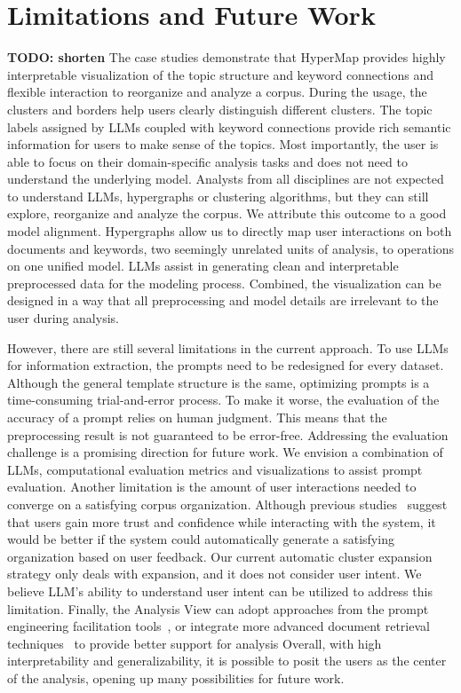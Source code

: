 \section{Limitations and Future Work}
\textbf{TODO: shorten}
The case studies demonstrate that HyperMap provides highly interpretable visualization of the topic structure and keyword connections and flexible interaction to reorganize and analyze a corpus.
During the usage, the clusters and borders help users clearly distinguish different clusters.
The topic labels assigned by LLMs coupled with keyword connections provide rich semantic information for users to make sense of the topics.
Most importantly, the user is able to focus on their domain-specific analysis tasks and does not need to understand the underlying model. 
Analysts from all disciplines are not expected to understand LLMs, hypergraphs or clustering algorithms, but they can still explore, reorganize and analyze the corpus. 
We attribute this outcome to a good model alignment. 
Hypergraphs allow us to directly map user interactions on both documents and keywords, two seemingly unrelated units of analysis, to operations on one unified model. 
LLMs assist in generating clean and interpretable preprocessed data for the modeling process.
Combined, the visualization can be designed in a way that all preprocessing and model details are irrelevant to the user during analysis.

However, there are still several limitations in the current approach.
To use LLMs for information extraction, the prompts need to be redesigned for every dataset.
Although the general template structure is the same, optimizing prompts is a time-consuming trial-and-error process.
To make it worse, the evaluation of the accuracy of a prompt relies on human judgment.
This means that the preprocessing result is not guaranteed to be error-free.
Addressing the evaluation challenge is a promising direction for future work.
We envision a combination of LLMs, computational evaluation metrics and visualizations to assist prompt evaluation. 
Another limitation is the amount of user interactions needed to converge on a satisfying corpus organization.
Although previous studies~\cite{bach2022systematic} suggest that users gain more trust and confidence while interacting with the system, 
it would be better if the system could automatically generate a satisfying organization based on user feedback.
Our current automatic cluster expansion strategy only deals with expansion, and it does not consider user intent.
We believe LLM's ability to understand user intent can be utilized to address this limitation.
Finally, the Analysis View can adopt approaches from the prompt engineering facilitation tools~\cite{petridis2023promptinfuser, dang2023choice}, or integrate more advanced document retrieval techniques~\cite{qiu2022docflow} to provide better support for analysis
Overall, with high interpretability and generalizability, it is possible to posit the users as the center of the analysis, opening up many possibilities for future work. 